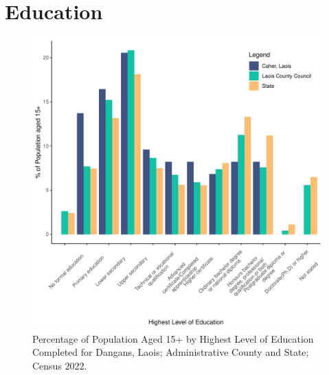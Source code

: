 \documentclass{article}
\begin{document}
\section{Education}\label{sect:Edu}
\begin{figure}[H]
	\centering
	\includegraphics[width = 120mm]{../figures/EduED.pdf}
	\caption{Percentage of Population Aged 15+ by Highest Level of Education Completed for Dangans, Laois; Administrative County and State; Census 2022.}
	\label{fig:vbnv}
	\end{figure}
\end{document}
